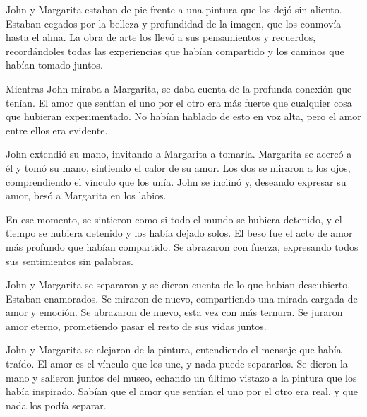 

John y Margarita estaban de pie frente a una pintura que los dejó sin aliento. Estaban cegados por la belleza y profundidad de la imagen, que los conmovía hasta el alma. La obra de arte los llevó a sus pensamientos y recuerdos, recordándoles todas las experiencias que habían compartido y los caminos que habían tomado juntos.

Mientras John miraba a Margarita, se daba cuenta de la profunda conexión que tenían. El amor que sentían el uno por el otro era más fuerte que cualquier cosa que hubieran experimentado. No habían hablado de esto en voz alta, pero el amor entre ellos era evidente.

John extendió su mano, invitando a Margarita a tomarla. Margarita se acercó a él y tomó su mano, sintiendo el calor de su amor. Los dos se miraron a los ojos, comprendiendo el vínculo que los unía. John se inclinó y, deseando expresar su amor, besó a Margarita en los labios.

En ese momento, se sintieron como si todo el mundo se hubiera detenido, y el tiempo se hubiera detenido y los había dejado solos. El beso fue el acto de amor más profundo que habían compartido. Se abrazaron con fuerza, expresando todos sus sentimientos sin palabras.

John y Margarita se separaron y se dieron cuenta de lo que habían descubierto. Estaban enamorados. Se miraron de nuevo, compartiendo una mirada cargada de amor y emoción. Se abrazaron de nuevo, esta vez con más ternura. Se juraron amor eterno, prometiendo pasar el resto de sus vidas juntos.

John y Margarita se alejaron de la pintura, entendiendo el mensaje que había traído. El amor es el vínculo que los une, y nada puede separarlos. Se dieron la mano y salieron juntos del museo, echando un último vistazo a la pintura que los había inspirado. Sabían que el amor que sentían el uno por el otro era real, y que nada los podía separar.
